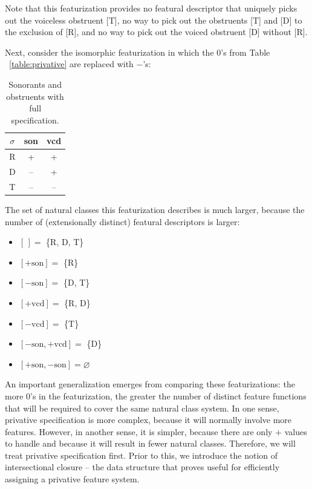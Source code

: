 \documentclass[11pt, oneside]{article}   	%
\begin{document}
\noindent Note that this featurization provides no featural descriptor that uniquely picks out the voiceless obstruent [T], no way to pick out the obstruents [T] and [D] to the exclusion of [R], and no way to pick out the voiced obstruent [D] without [R].

Next, consider the isomorphic featurization in which the $0$'s from Table ~\ref{table:privative} are replaced with $-$'s:

\begin{table}[h]
    \centering
    \begin{tabular} {|c||c|c|}
    \hline
        $\sigma$ & son & vcd \\ \hline
        R & + & + \\
        D & -- & + \\
        T & -- & -- \\
        \hline
    \end{tabular}
    \caption{Sonorants and obstruents with full specification.}
    \label{table:full}
\end{table}

\noindent The set of natural classes this featurization describes is much larger, because the number of (extensionally distinct) featural descriptors is larger: \begin{itemize}
    \item $[\,] =$ \{R, D, T\}
    \item $[+\text{son}] =$ \{R\}
    \item $[-\text{son}] =$ \{D, T\}
    \item $[+\text{vcd}] =$ \{R, D\}
    \item $[-\text{vcd}] =$ \{T\}
    \item $[-\text{son},+\text{vcd}] =$ \{D\}
    \item $[+\text{son},-\text{son}] = \varnothing$
    \end{itemize}

\noindent An important generalization emerges from comparing these featurizations: the more $0$'s in the featurization, the greater the number of distinct feature functions that will be required to cover the same natural class system. In one sense, privative specification is more complex, because it will normally involve more features. However, in another sense, it is simpler, because there are only $+$ values to handle and because it will result in fewer natural classes. Therefore, we will treat privative specification first. Prior to this, we introduce the notion of intersectional closure -- the data structure that proves useful for efficiently assigning a privative feature system.
\end{document}
